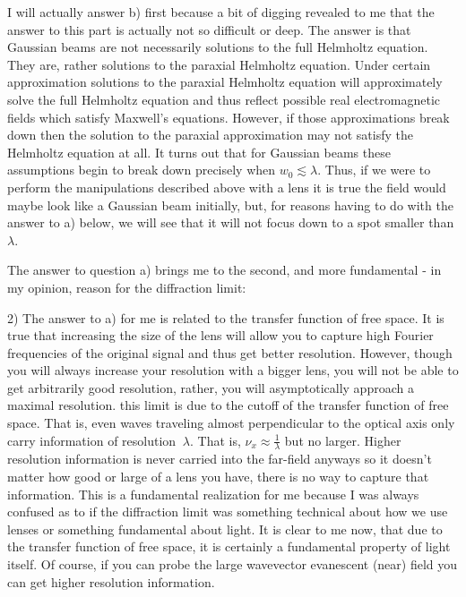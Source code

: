 \documentclass[12pt]{article}
\begin{document}
I will actually answer b) first because a bit of digging revealed to me that the answer to this part is actually not so difficult or deep. The answer is that Gaussian beams are not necessarily solutions to the full Helmholtz equation. They are, rather solutions to the paraxial Helmholtz equation. Under certain approximation solutions to the paraxial Helmholtz equation will approximately solve the full Helmholtz equation and thus reflect possible real electromagnetic fields which satisfy Maxwell's equations. However, if those approximations break down then the solution to the paraxial approximation may not satisfy the Helmholtz equation at all. It turns out that for Gaussian beams these assumptions begin to break down precisely when $w_0 \lesssim \lambda$. Thus, if we were to perform the manipulations described above with a lens it is true the field would maybe look like a Gaussian beam initially, but, for reasons having to do with the answer to a) below, we will see that it will not focus down to a spot smaller than $\lambda$.

The answer to question a) brings me to the second, and more fundamental - in my opinion, reason for the diffraction limit:

2) The answer to a) for me is related to the transfer function of free space. It is true that increasing the size of the lens will allow you to capture high Fourier frequencies of the original signal and thus get better resolution. However, though you will always increase your resolution with a bigger lens, you will not be able to get arbitrarily good resolution, rather, you will asymptotically approach a maximal resolution. this limit is due to the cutoff of the transfer function of free space. That is, even waves traveling almost perpendicular to the optical axis only carry information of resolution $~\lambda$. That is, $\nu_x \approx \frac{1}{\lambda}$ but no larger. Higher resolution information is never carried into the far-field anyways so it doesn't matter how good or large of a lens you have, there is no way to capture that information. This is a fundamental realization for me because I was always confused as to if the diffraction limit was something technical about how we use lenses or something fundamental about light. It is clear to me now, that due to the transfer function of free space, it is certainly a fundamental property of light itself. Of course, if you can probe the large wavevector evanescent (near) field you can get higher resolution information.
\end{document}
